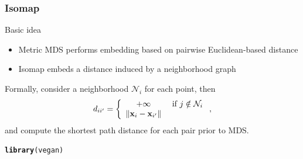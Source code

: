 \documentclass{beamer}\usepackage[]{graphicx}\usepackage[]{color}
\makeatletter
\newcommand{\hlstd}[1]{\textcolor[rgb]{0.345,0.345,0.345}{#1}}%
\newcommand{\hlkwd}[1]{\textcolor[rgb]{0.737,0.353,0.396}{\textbf{#1}}}%
\newenvironment{kframe}{%
 \def\at@end@of@kframe{}%
 \ifinner\ifhmode%
  \def\at@end@of@kframe{\end{minipage}}%
  \begin{minipage}{\columnwidth}%
 \fi\fi%
 \def\FrameCommand##1{\hskip\@totalleftmargin \hskip-\fboxsep
 \colorbox{shadecolor}{##1}\hskip-\fboxsep
     \hskip-\linewidth \hskip-\@totalleftmargin \hskip\columnwidth}%
 \MakeFramed {\advance\hsize-\width
   \@totalleftmargin\z@ \linewidth\hsize
   \@setminipage}}%
 {\par\unskip\endMakeFramed%
 \at@end@of@kframe}
\newenvironment{knitrout}{}{} %
\makeatother
\begin{document}
\begin{frame}
   \frametitle{Isomap}
 
   \begin{block}{Basic idea}
     \begin{itemize}
       \item Metric  MDS performs embedding based on pairwise Euclidean-based distance
       \item Isomap embeds a distance induced by a neighborhood graph
     \end{itemize}
   \end{block}
 
Formally, consider a neighborhood $\mathcal{N}_i$ for each point, then
\begin{equation*}
  d_{ii'} = \left\{
    \begin{array}{cc}
    + \infty & \text{ if }j \notin \mathcal{N}_i\\
    \| \mathbf{x}_i - \mathbf{x}_{i'} \|& \\
    \end{array}
  \right.,
\end{equation*}
 and compute the shortest path distance for each pair prior to MDS.
 
\begin{knitrout}\scriptsize
{}\color{fgcolor}\begin{kframe}
\begin{alltt}
\hlkwd{library}\hlstd{(vegan)}
\end{alltt}
\end{kframe}
\end{knitrout}
% 
\end{frame}
\end{document}
